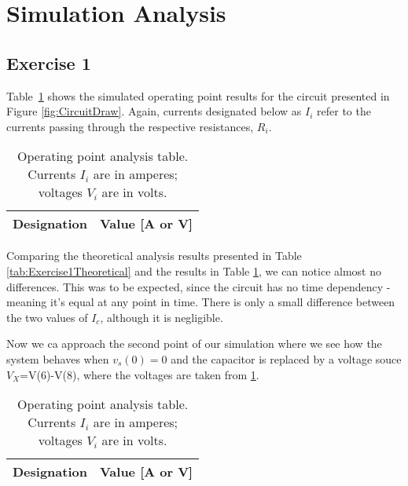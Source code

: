 \section{Simulation Analysis}
\label{sec:simulation}

\subsection{Exercise 1}

Table~\ref{tab:Exercise1Simulation} shows the simulated operating point results for the circuit presented in Figure \ref{fig:CircuitDraw}. Again, currents designated below as $I_i$ refer to the currents passing through the respective resistances, $R_i$.

\begin{table}[H]
  \centering
  \begin{tabular}{|c|c|}
    \hline    
    {\bf Designation} & {\bf Value [A or V]} \\ \hline
    
  \end{tabular}
  \caption{Operating point analysis table. Currents $I_i$ are in amperes; voltages $V_i$ are in volts.}
  \label{tab:Exercise1Simulation}
\end{table}

Comparing the theoretical analysis results presented in Table \ref{tab:Exercise1Theoretical} and the results in Table \ref{tab:Exercise1Simulation}, we can notice almost no differences. This was to be expected, since the circuit has no time dependency - meaning it's equal at any point in time. There is only a small difference between the two values of $I_c$, although it is negligible.\par
Now we ca approach the second point of our simulation where we see how the system behaves when $v_s(0)=0$ and the capacitor is replaced by a voltage souce $V_X$=V(6)-V(8), where the voltages are taken from \ref{tab:Exercise1Simulation}.

\begin{table}[H]
  \centering
  \begin{tabular}{|c|c|}
    \hline    
    {\bf Designation} & {\bf Value [A or V]} \\ \hline
    
  \end{tabular}
  \caption{Operating point analysis table. Currents $I_i$ are in amperes; voltages $V_i$ are in volts.}
  \label{tab:Exercise2Simulation}
\end{table}

